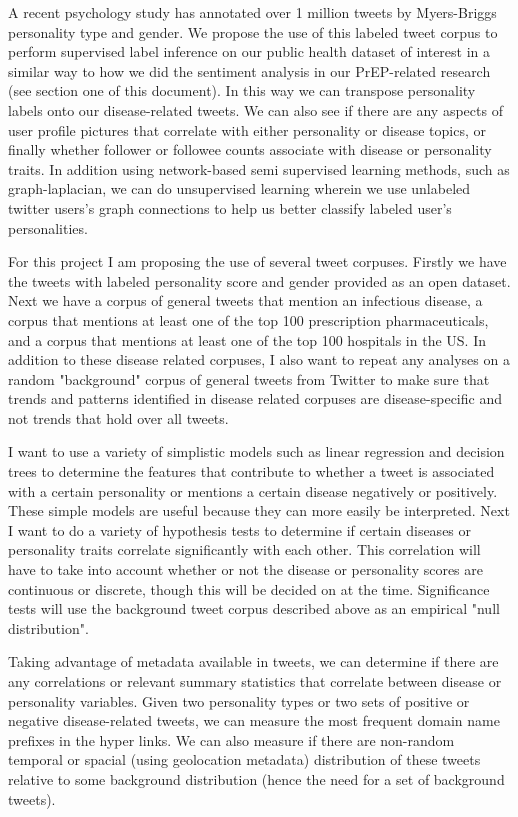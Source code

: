 A recent psychology study has annotated over 1 million tweets by Myers-Briggs personality type and gender\cite{plank2015personality}. We propose the use of this labeled tweet corpus to perform supervised label inference on our public health dataset of interest in a similar way to how we did the sentiment analysis in our PrEP-related research (see section one of this document). In this way we can transpose personality labels onto our disease-related tweets.  We can also see if there are any aspects of user profile pictures that correlate with either personality or disease topics, or finally whether follower or followee counts associate with disease or personality traits. In addition using network-based semi supervised learning methods, such as graph-laplacian\cite{sindhwani2005beyond}, we can do unsupervised learning wherein we use unlabeled twitter users's graph connections to help us better classify labeled user's personalities.

For this project I am proposing the use of several tweet corpuses. Firstly we have the tweets with labeled personality score and gender provided as an open dataset\cite{plank2015personality}. Next we have a corpus of general tweets that mention an infectious disease, a corpus that mentions at least one of the top 100 prescription pharmaceuticals, and a corpus that mentions at least one of the top 100 hospitals in the US. In addition to these disease related corpuses, I also want to repeat any analyses on a random "background" corpus of general tweets from Twitter to make sure that trends and patterns identified in disease related corpuses are disease-specific and not trends that hold over all tweets.

I want to use a variety of simplistic models such as linear regression and decision trees to determine the features that contribute to whether a tweet is associated with a certain personality or mentions a certain disease negatively or positively. These simple models are useful because they can more easily be interpreted. Next I want to do a variety of hypothesis tests to determine if certain diseases or personality traits correlate significantly with each other. This correlation will have to take into account whether or not the disease or personality scores are continuous or discrete, though this will be decided on at the time. Significance tests will use the background tweet corpus described above as an empirical "null distribution".

Taking advantage of metadata available in tweets, we can determine if there are any correlations or relevant summary statistics that correlate between disease or personality variables. Given two personality types or two sets of positive or negative disease-related tweets, we can measure the most frequent domain name prefixes in the hyper links. We can also measure if there are non-random temporal or spacial (using geolocation metadata) distribution of these tweets relative to some background distribution (hence the need for a set of background tweets).

